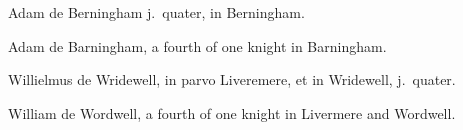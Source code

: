 \documentclass{book}
\begin{document}
\begin{paracol}{2}
\switchcolumn*

\begin{otherlanguage}{latin}
Adam de Berningham j.\ quater, in Berningham.
\end{otherlanguage}

\switchcolumn

Adam de Barningham, a fourth of one knight in Barningham.

\switchcolumn*

\begin{otherlanguage}{latin}
Willielmus de Wridewell, in parvo Liveremere, et in Wridewell, j.\ quater.
\end{otherlanguage}

\switchcolumn

William de Wordwell, a fourth of one knight in Livermere and Wordwell.



\end{paracol}
\end{document}
